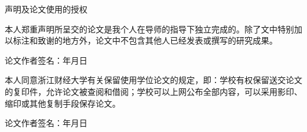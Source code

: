 

\pagestyle{originality}


\setlength{\parskip}{0.4em}
\renewcommand{\baselinestretch}{1.41}

\vspace*{-6mm}

\begin{center}
    \heiti{}\textmd{声明及论文使用的授权}
\end{center}

\vspace{10mm}



本人郑重声明所呈交的论文是我个人在导师的指导下独立完成的。除了文中特别加以标注和致谢的地方外，论文中不包含其他人已经发表或撰写的研究成果。

\vspace{15mm}

\begin{flushright}
    论文作者签名：\hspace{75mm}年\hspace{8mm}月\hspace{8mm}日
\end{flushright}

\vspace{40mm}



本人同意浙江财经大学有关保留使用学位论文的规定，即：学校有权保留送交论文的复印件，允许论文被查阅和借阅；学校可以上网公布全部内容，可以采用影印、缩印或其他复制手段保存论文。

\vspace*{15mm}

\begin{flushright}
    论文作者签名：\hspace{75mm}年\hspace{8mm}月\hspace{8mm}日
\end{flushright}

\newpage
